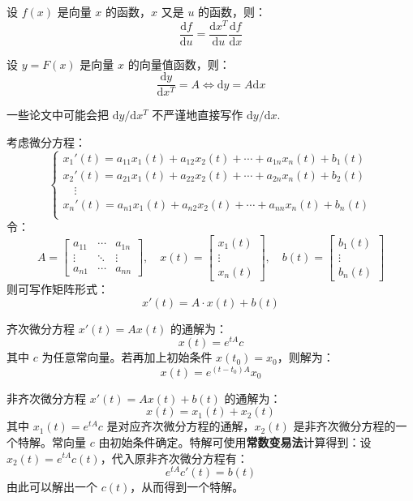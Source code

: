 \begin{property}[链式法则]
设 $f(x)$ 是向量 $x$ 的函数，$x$ 又是 $u$ 的函数，则：
\[
    \frac{\mathrm df}{\mathrm du}=\frac{\mathrm dx^T}{\mathrm du}\frac{\mathrm df}{\mathrm dx}
\]
\end{property}

\begin{theorem}[向量函数关于向量导数的微分形式]
设 $y=F(x)$ 是向量 $x$ 的向量值函数，则：
\[
    \frac{\mathrm dy}{\mathrm dx^T}=A\iff\mathrm dy=A\mathrm dx
\]
\end{theorem}
\begin{note}
一些论文中可能会把 $\mathrm dy/\mathrm dx^T$ 不严谨地直接写作 $\mathrm dy/\mathrm dx$.
\end{note}

\begin{example}[在微分方程中的应用]
考虑微分方程：
\[
    \begin{cases}
    x_1'(t)=a_{11}x_1(t)+a_{12}x_2(t)+\cdots+a_{1n}x_n(t)+b_1(t)\\
    x_2'(t)=a_{21}x_1(t)+a_{22}x_2(t)+\cdots+a_{2n}x_n(t)+b_2(t)\\
    \quad\vdots\\
    x_n'(t)=a_{n1}x_1(t)+a_{n2}x_2(t)+\cdots+a_{nn}x_n(t)+b_n(t)\\
    \end{cases}
\]
令：
\[
    A=\begin{bmatrix}a_{11}&\cdots&a_{1n}\\\vdots&\ddots&\vdots\\a_{n1}&\cdots&a_{nn}\end{bmatrix},\quad
x(t)=\begin{bmatrix}x_1(t)\\\vdots\\x_n(t)\end{bmatrix},\quad
b(t)=\begin{bmatrix}b_1(t)\\\vdots\\b_n(t)\end{bmatrix}
\]
则可写作矩阵形式：
\[
    x'(t)=A\cdot x(t)+b(t)
\]
\end{example}

\begin{theorem}
齐次微分方程 $x'(t)=Ax(t)$ 的通解为：
\[
    x(t)=e^{tA}c
\]
其中 $c$ 为任意常向量。若再加上初始条件 $x(t_0)=x_0$，则解为：
\[
    x(t)=e^{(t-t_0)A}x_0
\]
\end{theorem}

\begin{theorem}
非齐次微分方程 $x'(t)=Ax(t)+b(t)$ 的通解为：
\[
    x(t)=x_1(t)+x_2(t)
\]
其中 $x_1(t)=e^{tA}c$ 是对应齐次微分方程的通解，$x_2(t)$ 是非齐次微分方程的一个特解。常向量 $c$ 由初始条件确定。特解可使用\textbf{常数变易法}计算得到：设 $x_2(t)=e^{tA}c(t)$，代入原非齐次微分方程有：
\[
    e^{tA}c'(t)=b(t)
\]
由此可以解出一个 $c(t)$，从而得到一个特解。
\end{theorem}
